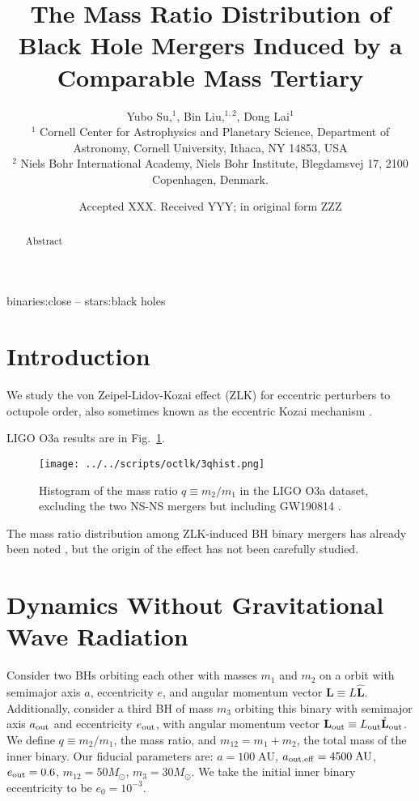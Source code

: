\documentclass[
        fleqn,
        usenatbib,
    ]{mnras}
\title[Mass Ratio Distribution]{The Mass Ratio Distribution of
Black Hole Mergers Induced by a Comparable Mass Tertiary}
\author[Y. Su et\ al.]{
Yubo Su,$^1$,
Bin Liu,$^{1,2}$,
Dong Lai$^1$
\\
$^1$ Cornell Center for Astrophysics and Planetary Science, Department of
Astronomy, Cornell University, Ithaca, NY 14853, USA\\
$^2$ Niels Bohr International Academy, Niels Bohr Institute, Blegdamsvej 17,
2100 Copenhagen, Denmark.
}
\date{Accepted XXX\@. Received YYY\@; in original form ZZZ}
\newcommand*{\bm}[1]{\mathbf{#1}}
\newcommand*{\uv}[1]{\hat{\mathbf{#1}}}
\newlength{\colummwidth}
\begin{document}
\label{firstpage}
\pagerange{\pageref{firstpage}--\pageref{lastpage}}
\maketitle

\begin{abstract}
    Abstract
\end{abstract}

\begin{keywords}
binaries:close -- stars:black holes %
\end{keywords}

\section{Introduction}\label{s:intro}

We study the von Zeipel-Lidov-Kozai effect (ZLK) for eccentric perturbers to
octupole order, also sometimes known as the eccentric Kozai mechanism
\citep[e.g.][]{lithwick2011eccentric}.

LIGO O3a results are in Fig.~\ref{fig:qhist}.
\begin{figure}
    \centering
    \texttt{[image: ../../scripts/octlk/3qhist.png]}
    \caption{Histogram of the mass ratio $q \equiv m_2 / m_1$ in the LIGO O3a
    dataset, excluding the two NS-NS mergers but including GW190814
    \citep{LIGOO3a}.}\label{fig:qhist}
\end{figure}

The mass ratio distribution among ZLK-induced BH binary mergers has already been
noted \citep[see Fig.~10 of][]{silsbee2017lidov}, but the origin of the effect
has not been carefully studied.

\section{Dynamics Without Gravitational Wave Radiation}\label{s:background}

Consider two BHs orbiting each other with masses $m_1$ and $m_2$ on a orbit with
semimajor axis $a$, eccentricity $e$, and angular momentum vector $\bm{L} \equiv
L\uv{L}$. Additionally, consider a third BH of mass $m_3$ orbiting this binary
with semimajor axis $a_{\rm out}$ and eccentricity $e_{\rm out}$, with angular
momentum vector $\bm{L}_{\rm out} \equiv L_{\rm out} \uv{L}_{\rm out}$. We
define $q \equiv m_2 / m_1$, the mass ratio, and $m_{12} = m_1 + m_2$, the total
mass of the inner binary. Our fiducial parameters are: $a = 100\;\mathrm{AU}$,
$a_{\rm out, eff} = 4500\;\mathrm{AU}$, $e_{\rm out} = 0.6$, $m_{12} =
50M_{\odot}$, $m_3 = 30M_{\odot}$. We take the initial inner binary eccentricity
to be $e_0 = 10^{-3}$.
\end{document}
